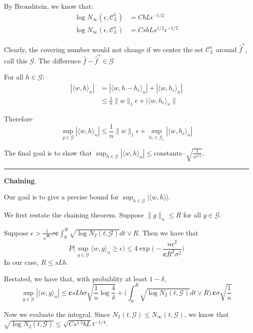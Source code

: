 \documentclass{article}
\begin{document}
{By Bronshtein, we know that:
\begin{align*}
\log N_\infty(\epsilon, \mathcal{C}_L^1) &= C bL \epsilon^{-1/2} \\
\log N_\infty(\epsilon, \mathcal{C}_L^s) &= C sbL s^{1/2} \epsilon^{-1/2} 
\end{align*}

Clearly, the covering number would not change if we center the set $\mathcal{C}_L^s$ around $\hat{f}^*$, call this $\mathcal{G}$. The difference $\hat{f} - \hat{f}^* \in \mathcal{G}$

For all $h \in \mathcal{G}$:
\begin{align*}
|\langle w, h \rangle_n | &= |\langle w, h - h_\epsilon \rangle_n | 
     + |\langle w, h_\epsilon \rangle_n | \\
 &\leq \frac{1}{n} \| w \|_1  \epsilon + |\langle w, h_\epsilon \rangle_n \| 
\end{align*}

Therefore
\[
\sup_{g \in \mathcal{G}} | \langle w, h \rangle_n | \leq 
      \frac{1}{n} \|w\|_1 \epsilon + 
      \sup_{h_\epsilon \in \mathcal{G}_\epsilon} | \langle w, h_\epsilon \rangle_n |
\]

The final goal is to show that $\sup_{h \in \mathcal{G}} | \langle w, h \rangle_n | \leq 
\textrm{constants} \cdot \sqrt{\frac{1}{n^{4/5}}}$.


\rule{5cm}{0.4pt}
\vspace{0.2in}

\textbf{Chaining}.

Our goal is to give a precise bound for $\sup_{h \in \mathcal{G}} | \langle w, h \rangle|$.

We first restate the chaining theorem. Suppose $\| g \|_n \leq R$ for all $g \in \mathcal{G}$. 

Suppose $\epsilon > \frac{1}{\sqrt{n}}\sigma \mathbf{c} \int_0^R \sqrt{ \log N_2(t, \mathcal{G}) }dt \vee R $. 
Then we have that
\[
P\Big( \sup_{g \in \mathcal{G}} \langle w, g \rangle_n \geq \epsilon \Big) \leq
  4 \exp \Big( - \frac{ n \epsilon^2}{ \mathbf{c} R^2 \sigma^2} \Big)
\]
In our case, $R \leq sLb$.

Restated, we have that, with probablity at least $1-\delta$,
\[
\sup_{g \in \mathcal{G}} | \langle w, g \rangle_n | \leq 
   \mathbf{c} sLb \sigma \sqrt{ \frac{1}{n} \log \frac{4}{\delta}} + 
      \Big( \int_0^R \sqrt{\log N_2(t, \mathcal{G})}dt \vee R \Big)\, 
       \mathbf{c} \sigma \sqrt{\frac{1}{n}} 
\]

Now we evaluate the integral. Since $N_2(t, \mathcal{G}) \leq N_\infty(t, \mathcal{G})$, we know that $\sqrt{\log N_2(t, \mathcal{G})} \leq \sqrt{C s^{1.5} b L} t^{-1/4}$.

}
\end{document}
